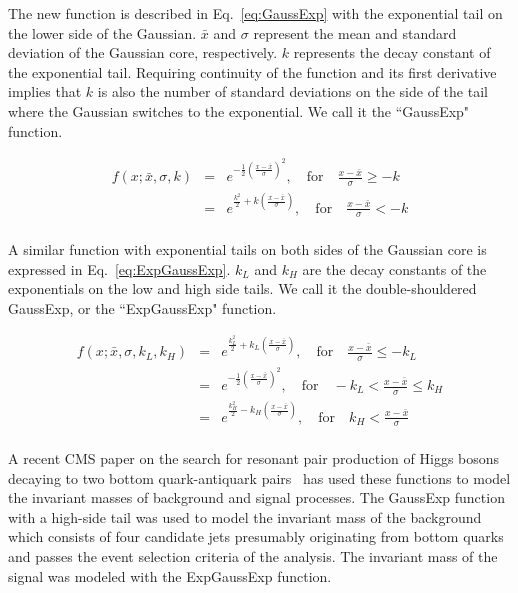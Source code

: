 \documentclass[10pt,letterpaper]{article}
\begin{document}
The new function is described in Eq.~\ref{eq:GaussExp} with the exponential tail on the lower side of the Gaussian. $\bar{x}$ and $\sigma$ represent the mean and standard deviation of the Gaussian core, respectively. $k$ represents the decay constant of the exponential tail. Requiring continuity of the function and its first derivative implies that $k$ is also the number of standard deviations on the side of the tail where the Gaussian switches to the exponential. We call it the ``GaussExp" function.

\begin{eqnarray}
\label{eq:GaussExp}
f(x; \bar{x}, \sigma, k) &=& e^{-\frac{1}{2}\left(\frac{x-\bar{x}}{\sigma}\right)^2}, \quad \textrm{for} \quad \frac{x-\bar{x}}{\sigma} \geq -k  \\
                         &=& e^{\frac{k^2}{2}+k\left(\frac{x-\bar{x}}{\sigma}\right)}, \quad \textrm{for} \quad \frac{x-\bar{x}}{\sigma} < -k \nonumber
\end{eqnarray} \\

A similar function with exponential tails on both sides of the Gaussian core is expressed in Eq.~\ref{eq:ExpGaussExp}. $k_L$ and $k_H$ are the decay constants of the exponentials on the low and high side tails. We call it the double-shouldered GaussExp, or the ``ExpGaussExp" function.

\begin{eqnarray}
\label{eq:ExpGaussExp}
f(x; \bar{x}, \sigma, k_L, k_H) &=& e^{\frac{k_L^2}{2}+k_L\left(\frac{x-\bar{x}}{\sigma}\right)}, \quad \textrm{for} \quad \frac{x-\bar{x}}{\sigma} \leq -k_L \\
                         &=& e^{-\frac{1}{2}\left(\frac{x-\bar{x}}{\sigma}\right)^2}, \quad \textrm{for} \quad -k_L < \frac{x-\bar{x}}{\sigma} \leq k_H  \nonumber \\
                         &=& e^{\frac{k_H^2}{2}-k_H\left(\frac{x-\bar{x}}{\sigma}\right)}, \quad \textrm{for} \quad k_H < \frac{x-\bar{x}}{\sigma} \nonumber
\end{eqnarray} \\

A recent CMS paper on the search for resonant pair production of Higgs bosons decaying to two bottom quark-antiquark pairs~\cite{Khachatryan2015560} has used these functions to model the invariant masses of background and signal processes. The GaussExp function with a high-side tail was used to model the invariant mass of the background which consists of four candidate jets presumably originating from bottom quarks and passes the event selection criteria of the analysis. The invariant mass of the signal was modeled with the ExpGaussExp function.
\end{document}
